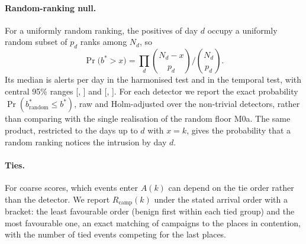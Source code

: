\documentclass[11pt,a4paper]{article}
\newcommand{\Rcamp}{R_{\mathrm{camp}}}
\begin{document}
\paragraph{Random-ranking null.} For a uniformly random ranking, the positives of day $d$ occupy a uniformly random subset of $p_d$ ranks among $N_d$, so
\begin{equation}
\Pr\bigl(b^{*} > x\bigr) = \prod_{d} \binom{N_d - x}{p_d} \Big/ \binom{N_d}{p_d}.
\end{equation}
Its median is \HarmNullFirstDetectionMedian{} alerts per day in the harmonised test and \TempNullFirstDetectionMedian{} in the temporal test, with central 95\% ranges [\HarmNullFirstDetectionLow{}, \HarmNullFirstDetectionHigh{}] and [\TempNullFirstDetectionLow{}, \TempNullFirstDetectionHigh{}]. For each detector we report the exact probability $\Pr(b^{*}_{\mathrm{random}} \le b^{*})$, raw and Holm-adjusted over the non-trivial detectors, rather than comparing with the single realisation of the random floor M0a. The same product, restricted to the days up to $d$ with $x = k$, gives the probability that a random ranking notices the intrusion by day $d$.

\paragraph{Ties.} For coarse scores, which events enter $A(k)$ can depend on the tie order rather than the detector. We report $\Rcamp(k)$ under the stated arrival order with a bracket: the least favourable order (benign first within each tied group) and the most favourable one, an exact matching of campaigns to the places in contention, with the number of tied events competing for the last places.
\end{document}
